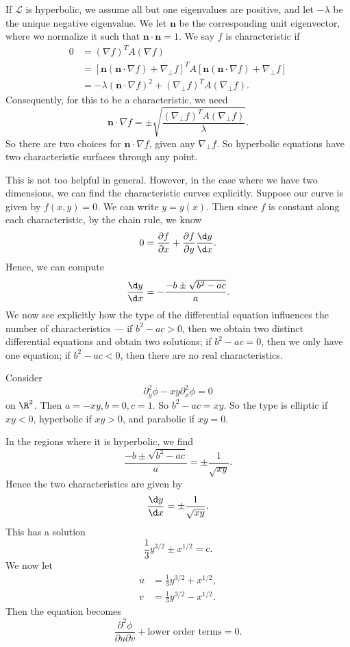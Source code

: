 \documentclass[a4paper]{article}
\begin{document}
If $\mathcal{L}$ is hyperbolic, we assume all but one eigenvalues are positive, and let $-\lambda$ be the unique negative eigenvalue. We let $\mathbf{n}$ be the corresponding unit eigenvector, where we normalize it such that $\mathbf{n}\cdot \mathbf{n} = 1$. We say $f$ is characteristic if
\begin{align*}
  0 &= (\nabla f)^T A(\nabla f) \\
  &= [\mathbf{n}(\mathbf{n}\cdot \nabla f) + \nabla_\perp f]^T A[\mathbf{n}(\mathbf{n}\cdot \nabla f) + \nabla_\perp f]\\
  &= -\lambda (\mathbf{n}\cdot \nabla f)^2 + (\nabla_\perp f)^T A(\nabla_\perp f).
\end{align*}
Consequently, for this to be a characteristic, we need
\[
  \mathbf{n}\cdot \nabla f = \pm \sqrt{\frac{(\nabla_\perp f)^T A(\nabla_\perp f)}{\lambda}}.
\]
So there are two choices for $\mathbf{n}\cdot \nabla f$, given any $\nabla_\perp f$. So hyperbolic equations have two characteristic surfaces through any point. %

This is not too helpful in general. However, in the case where we have two dimensions, we can find the characteristic curves explicitly. Suppose our curve is given by $f(x, y) = 0$. We can write $y = y(x)$. Then since $f$ is constant along each characteristic, by the chain rule, we know
\[
  0 = \frac{\partial f}{\partial x} + \frac{\partial f}{\partial y} \frac{\d y}{\d x}.
\]
Hence, we can compute
\[
  \frac{\d y}{\d x} = -\frac{-b \pm \sqrt{b^2 - ac}}{a}.
\]
We now see explicitly how the type of the differential equation influences the number of characteristics --- if $b^2 - ac > 0$, then we obtain two distinct differential equations and obtain two solutions; if $b^2 - ac = 0$, then we only have one equation; if $b^2 - ac < 0$, then there are no real characteristics.

\begin{eg}
  Consider
  \[
    \partial_y^2 \phi - xy \partial_x^2 \phi = 0
  \]
  on $\R^2$. Then $a = -xy, b = 0, c = 1$. So $b^2 - ac = xy$. So the type is elliptic if $xy < 0$, hyperbolic if $xy > 0$, and parabolic if $xy = 0$.

  In the regions where it is hyperbolic, we find
  \[
    \frac{-b \pm \sqrt{b^2 - ac}}{a} = \pm \frac{1}{\sqrt{xy}}.
  \]
  Hence the two characteristics are given by
  \[
    \frac{\d y}{\d x} = \pm \frac{1}{\sqrt{xy}}.
  \]
  This has a solution
  \[
    \frac{1}{3}y^{3/2}\pm x^{1/2} = c.
  \]
  We now let
  \begin{align*}
    u &= \frac{1}{3}y^{3/2} + x^{1/2},\\
    v &= \frac{1}{3}y^{3/2} - x^{1/2}.
  \end{align*}
  Then the equation becomes
  \[
    \frac{\partial^2 \phi}{\partial u\partial v} + \text{lower order terms} = 0.
  \]
\end{eg}
\end{document}
